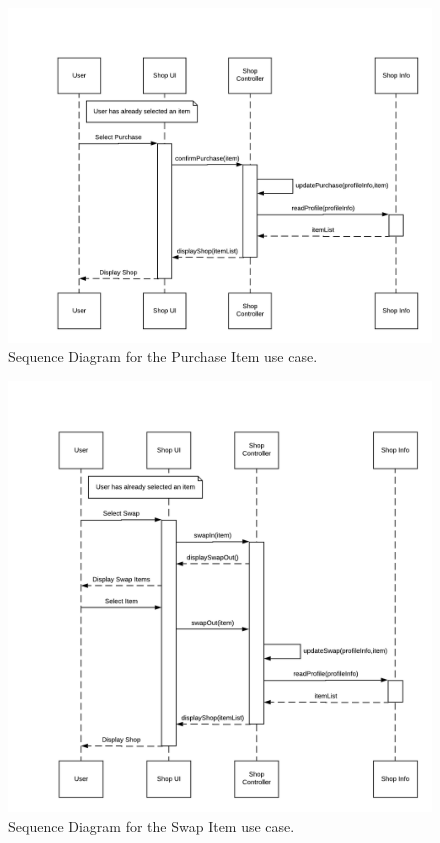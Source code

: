 \documentclass[]{article}
\begin{document}
\begin{figure}[H]
    \centering
    \includegraphics[width=\textwidth]{SD/PurchaseItemSD.png}
    \caption{Sequence Diagram for the Purchase Item use case.}
    \label{fig:sd}
\end{figure}

\begin{figure}[H]
    \centering
    \includegraphics[width=\textwidth]{SD/SwapItemSD.png}
    \caption{Sequence Diagram for the Swap Item use case.}
    \label{fig:sd}
\end{figure}
\end{document}
